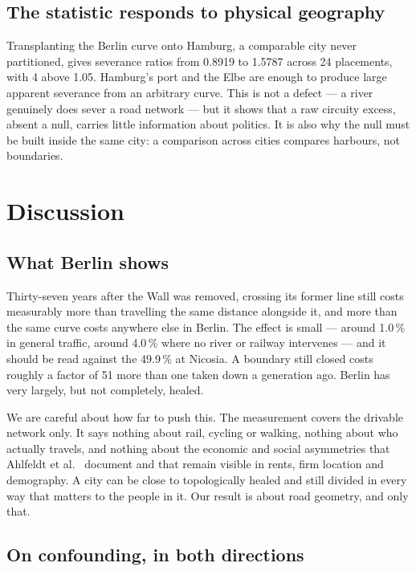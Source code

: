 \documentclass[11pt,a4paper]{article}
\begin{document}
\subsection{The statistic responds to physical geography}

Transplanting the Berlin curve onto Hamburg, a comparable city never
partitioned, gives severance ratios from 0.8919 to 1.5787 across
24 placements, with 4 above 1.05. Hamburg's port and the Elbe
are enough to produce large apparent severance from an arbitrary curve. This is
not a defect --- a river genuinely does sever a road network --- but it shows
that a raw circuity excess, absent a null, carries little information about
politics. It is also why the null must be built inside the same city: a
comparison across cities compares harbours, not boundaries.

\section{Discussion}

\subsection{What Berlin shows}

Thirty-seven years after the Wall was removed, crossing its former line still
costs measurably more than travelling the same distance alongside it, and more
than the same curve costs anywhere else in Berlin. The effect is small ---
around 1.0\,\% in general traffic, around 4.0\,\% where no
river or railway intervenes --- and it should be read against the
49.9\,\% at Nicosia. A boundary still closed costs roughly a factor of
51 more than one taken down a generation ago. Berlin has very
largely, but not completely, healed.

We are careful about how far to push this. The measurement covers the drivable
network only. It says nothing about rail, cycling or walking, nothing about who
actually travels, and nothing about the economic and social asymmetries that
Ahlfeldt et al.\ \cite{ahlfeldt2015} document and that remain visible in rents,
firm location and demography. A city can be close to topologically healed and
still divided in every way that matters to the people in it. Our result is about
road geometry, and only that.

\subsection{On confounding, in both directions}
\end{document}
